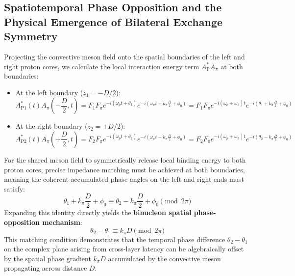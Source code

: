 \documentclass[12pt, a4paper]{article}
\begin{document}
\subsection{Spatiotemporal Phase Opposition and the Physical Emergence of Bilateral Exchange Symmetry}

Projecting the convective meson field onto the spatial boundaries of the left and right proton cores, we calculate the local interaction energy term $A_{\mathrm{P}}^* A_\pi$ at both boundaries:
\begin{itemize}
    \item At the left boundary ($z_1 = -D/2$):
    \begin{equation}
    A_{\mathrm{P1}}^*(t) A_\pi\left(-\frac{D}{2}, t\right) = F_1 F_\pi e^{-i(\omega_p t + \theta_1)} e^{-i\left(\omega_\pi t + k_\pi \frac{D}{2} + \phi_0\right)} = F_1 F_\pi e^{-i(\omega_p + \omega_\pi)t} e^{-i\left(\theta_1 + k_\pi \frac{D}{2} + \phi_0\right)}
    \end{equation}
    \item At the right boundary ($z_2 = +D/2$):
    \begin{equation}
    A_{\mathrm{P2}}^*(t) A_\pi\left(+\frac{D}{2}, t\right) = F_2 F_\pi e^{-i(\omega_p t + \theta_2)} e^{-i\left(\omega_\pi t - k_\pi \frac{D}{2} + \phi_0\right)} = F_2 F_\pi e^{-i(\omega_p + \omega_\pi)t} e^{-i\left(\theta_2 - k_\pi \frac{D}{2} + \phi_0\right)}
    \end{equation}
\end{itemize}
For the shared meson field to symmetrically release local binding energy to both proton cores, precise impedance matching must be achieved at both boundaries, meaning the coherent accumulated phase angles on the left and right ends must satisfy:
\begin{equation}
\theta_1 + k_\pi \frac{D}{2} + \phi_0 \equiv \theta_2 - k_\pi \frac{D}{2} + \phi_0 \pmod{2\pi}
\end{equation}
Expanding this identity directly yields the \textbf{binucleon spatial phase-opposition mechanism}:
\begin{equation}
\theta_2 - \theta_1 \equiv k_\pi D \pmod{2\pi}
\end{equation}
This matching condition demonstrates that the temporal phase difference $\theta_2 - \theta_1$ on the complex plane arising from cross-layer latency can be algebraically offset by the spatial phase gradient $k_\pi D$ accumulated by the convective meson propagating across distance $D$.
\end{document}
